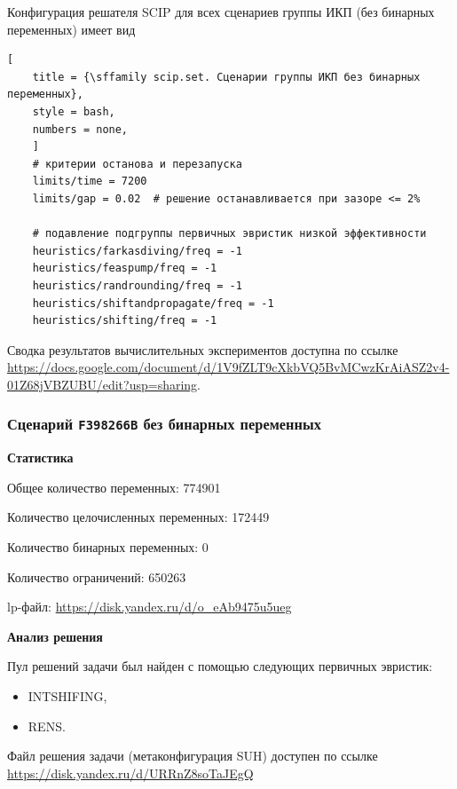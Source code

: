 \documentclass[%
	11pt,
	a4paper,
	utf8,
		]{article}
\begin{document}

Конфигурация решателя SCIP для всех сценариев группы ИКП (без бинарных переменных) имеет вид
\begin{lstlisting}[
	title = {\sffamily scip.set. Сценарии группы ИКП без бинарных переменных},
	style = bash,
	numbers = none,
	]
	# критерии останова и перезапуска
	limits/time = 7200
	limits/gap = 0.02  # решение останавливается при зазоре <= 2%
	
	# подавление подгруппы первичных эвристик низкой эффективности
	heuristics/farkasdiving/freq = -1
	heuristics/feaspump/freq = -1
	heuristics/randrounding/freq = -1
	heuristics/shiftandpropagate/freq = -1
	heuristics/shifting/freq = -1
\end{lstlisting}

Сводка результатов вычислительных экспериментов доступна по ссылке \url{https://docs.google.com/document/d/1V9fZLT9cXkbVQ5BvMCwzKrAiASZ2v4-01Z68jVBZUBU/edit?usp=sharing}.

\subsubsection{Сценарий \texttt{F398266B} без бинарных переменных}

\textbf{Статистика}\vspace*{1mm}

Общее количество переменных: 774901

Количество целочисленных переменных: 172449

Количество бинарных переменных: 0

Количество ограничений: 650263

lp-файл: \url{https://disk.yandex.ru/d/o_eAb9475u5ueg}

\vspace*{5mm}\textbf{Анализ решения}\vspace*{1mm}

Пул решений задачи был найден с помощью следующих первичных эвристик:
\begin{itemize}
	\item INTSHIFING,
	
	\item RENS.
\end{itemize}

Файл решения задачи (метаконфигурация SUH) доступен по ссылке \url{https://disk.yandex.ru/d/URRnZ8soTaJEgQ}
\end{document}

